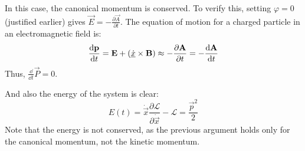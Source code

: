 In this case, the canonical momentum is conserved. 
To verify this, setting $\varphi=0$ (justified earlier) gives $\vec{E} = -\frac{\partial \vec{A}}{\partial t}$. 
The equation of motion for a charged particle in an electromagnetic field \cite{LandauLifschitzBand2} is:
\begin{equation*}
    \frac{\dd\vec{p}}{\dd t} = \vec{E} + \left(\uvec{\dot{x}}\times\vec{B}\right) \approx -\frac{\partial \vec{A}}{\partial t} = -\frac{\dd \vec{A}}{\dd t}   %
\end{equation*}
Thus, $\frac{\dd}{\dd t}\vec{P}=0$.

And also the energy of the system is clear:
\begin{equation}
    E(t) = \dot{\vec{x}}\frac{\partial \mathcal{L}}{\partial \dot{\vec{x}}}-\mathcal{L} = \frac{\vec{p}^2}{2} \label{eq:energy}
\end{equation}
Note that the energy is not conserved, as the previous argument holds only for the canonical momentum, not the kinetic momentum.

